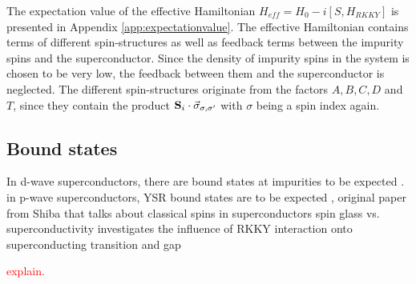 The expectation value of the effective Hamiltonian $H_{eff} = H_0 -i[S, H_{RKKY}]$ is presented in Appendix \ref{app:expectationvalue}. \newline
The effective Hamiltonian contains terms of different spin-structures as well as feedback terms between the impurity spins and the superconductor.
Since the density of impurity spins in the system is chosen to be very low, the feedback between them and the superconductor is neglected. \newline
The different spin-structures originate from the factors $A, B, C, D$ and $T$, since they contain the product $\vb{S}_i \cdot \Vec{\sigma}_{\sigma,\sigma'}$ with $\sigma$ being a spin index again.
\subsection{Bound states}
In d-wave superconductors, there are bound states at impurities to be expected \cite{balatsky2006impurity}. \newline
in p-wave superconductors, YSR bound states are to be expected \cite{kim2015impurity}, original paper from Shiba that talks about classical spins in superconductors \cite{shiba1968classical} \newline
spin glass vs. superconductivity investigates the influence of RKKY interaction onto superconducting transition and gap \cite{galitski2002spin} \newline

\textcolor{red}{explain.}
